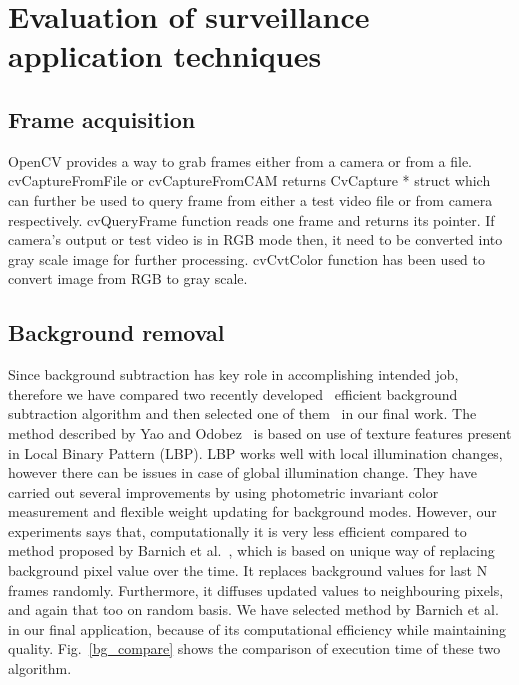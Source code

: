 \section {Evaluation of surveillance application techniques}
\subsection{Frame acquisition}
\indent OpenCV provides a way to grab frames either from a camera or
from a file. cvCaptureFromFile or cvCaptureFromCAM returns CvCapture *
struct which can further be used to query frame from either a test video
file or from camera respectively. cvQueryFrame function reads one frame
and returns its pointer. If camera's output or test video is in RGB mode
then, it need to be converted into gray scale image for further
processing. cvCvtColor function has been used to convert image from RGB
to gray scale.
\subsection{Background removal}
\indent Since background subtraction has key role in accomplishing
intended job, therefore we have compared two recently developed~\cite{3,
5} efficient background subtraction algorithm and then selected one of
them~\cite{5} in our final work. The method described by Yao and
Odobez~\cite{3} is based on use of texture features present in Local
Binary Pattern (LBP). LBP works well with local illumination changes,
however there can be issues in case of global illumination change. They
have carried out several improvements by using photometric invariant
color measurement and flexible weight updating for background
modes. However, our experiments says that, computationally it is very
less efficient compared to method proposed by Barnich et al.~\cite{9},
which is based on unique way of replacing background pixel value over
the time. It replaces background values for last N frames randomly.
Furthermore, it diffuses updated values to neighbouring pixels, and
again that too on random basis. We have selected method by Barnich et
al.~\cite{9} in our final application, because of its computational
efficiency while maintaining quality. Fig.~\ref{bg_compare} shows the
comparison of execution time of these two algorithm.

